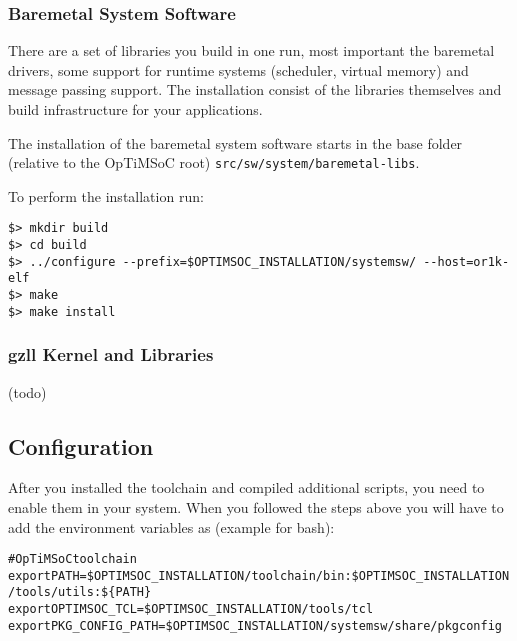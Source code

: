 \subsubsection{Baremetal System Software}

There are a set of libraries you build in one run, most important the
baremetal drivers, some support for runtime systems (scheduler,
virtual memory) and message passing support. The installation consist
of the libraries themselves and build infrastructure for your
applications.

The installation of the baremetal system software starts in the base
folder (relative to the OpTiMSoC root)
\verb|src/sw/system/baremetal-libs|.




To perform the installation run:

\begin{verbatim}
$> mkdir build
$> cd build
$> ../configure --prefix=$OPTIMSOC_INSTALLATION/systemsw/ --host=or1k-elf
$> make
$> make install
\end{verbatim}

\subsubsection{gzll Kernel and Libraries}

(todo)

\subsection{Configuration}

After you installed the toolchain and compiled additional scripts, you
need to enable them in your system. When you followed the steps above
you will have to add the environment variables as (example for bash):

\begin{alltt}
# OpTiMSoC toolchain
export PATH=\$OPTIMSOC_INSTALLATION/toolchain/bin:\$OPTIMSOC_INSTALLATION/tools/utils:\$\{PATH\}
export OPTIMSOC_TCL=\$OPTIMSOC_INSTALLATION/tools/tcl
export PKG_CONFIG_PATH=\$OPTIMSOC_INSTALLATION/systemsw/share/pkgconfig
\end{alltt}

